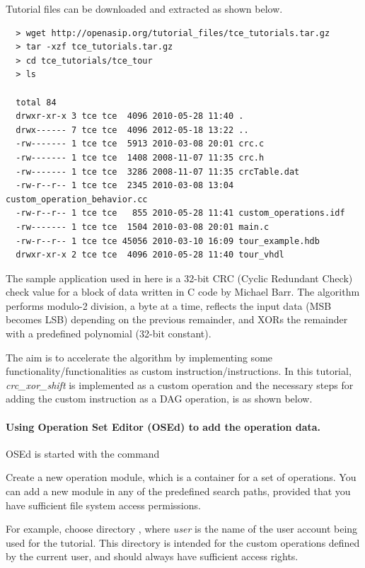 \documentclass[a4paper,twoside]{tceusermanual}
\begin{document}
Tutorial files can be downloaded and extracted as shown below.

\begin{verbatim}
  > wget http://openasip.org/tutorial_files/tce_tutorials.tar.gz
  > tar -xzf tce_tutorials.tar.gz
  > cd tce_tutorials/tce_tour
  > ls
  
  total 84
  drwxr-xr-x 3 tce tce  4096 2010-05-28 11:40 .
  drwx------ 7 tce tce  4096 2012-05-18 13:22 ..
  -rw------- 1 tce tce  5913 2010-03-08 20:01 crc.c
  -rw------- 1 tce tce  1408 2008-11-07 11:35 crc.h
  -rw------- 1 tce tce  3286 2008-11-07 11:35 crcTable.dat
  -rw-r--r-- 1 tce tce  2345 2010-03-08 13:04 custom_operation_behavior.cc
  -rw-r--r-- 1 tce tce   855 2010-05-28 11:41 custom_operations.idf
  -rw------- 1 tce tce  1504 2010-03-08 20:01 main.c
  -rw-r--r-- 1 tce tce 45056 2010-03-10 16:09 tour_example.hdb
  drwxr-xr-x 2 tce tce  4096 2010-05-28 11:40 tour_vhdl
\end{verbatim}

The sample application used in here is a 32-bit CRC (Cyclic Redundant Check) check value for a 
block of data written in C code by Michael Barr. The algorithm performs modulo-2 division, a 
byte at a time, reflects the input data (MSB becomes LSB) depending on the previous remainder, 
and XORs the remainder with a predefined polynomial (32-bit constant).

The aim is to accelerate the algorithm by implementing some functionality/functionalities as 
custom instruction/instructions. In this tutorial, \textit{crc\_xor\_shift} is implemented as a 
custom operation and the necessary steps for adding the custom instruction as a DAG operation, 
is as shown below.

\paragraph{Using Operation Set Editor (OSEd) to add the operation data.}

OSEd is started with the command


Create a new operation module, which is a container for a set of operations.
You can add a new module in any of the predefined search paths, provided
that you have sufficient file system access permissions.

For example, choose directory
, where \emph{user} is the
name of the user account being used for the tutorial.  This directory
is intended for the custom operations defined by the current user, and
should always have sufficient access rights.
\end{document}
